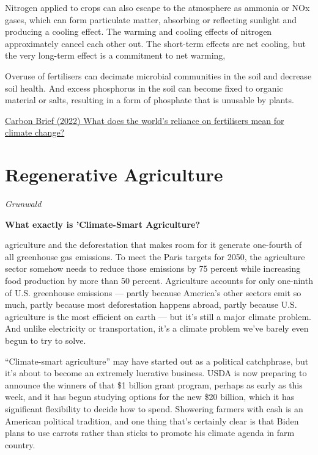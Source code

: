\documentclass[
]{book}
\begin{document}
Nitrogen applied to crops can also escape to the atmosphere as ammonia or NOx gases, which can form particulate matter, absorbing or reflecting sunlight and producing a cooling effect. The warming and cooling effects of nitrogen approximately cancel each other out.
The short-term effects are net cooling, but the very long-term effect is a commitment to net warming,

Overuse of fertilisers can decimate microbial communities in the soil and decrease soil health. And excess phosphorus in the soil can become fixed to organic material or salts, resulting in a form of phosphate that is unusable by plants.

\href{https://www.carbonbrief.org/qa-what-does-the-worlds-reliance-on-fertilisers-mean-for-climate-change/}{Carbon Brief (2022) What does the world's reliance on fertilisers mean for climate change?}

\hypertarget{regenerative-agriculture}{%
\section{Regenerative Agriculture}\label{regenerative-agriculture}}

\emph{Grunwald}

\textbf{What exactly is 'Climate-Smart Agriculture?}

agriculture and the deforestation that makes room for it generate one-fourth of all greenhouse gas emissions. To meet the Paris targets for 2050, the agriculture sector somehow needs to reduce those emissions by 75 percent while increasing food production by more than 50 percent. Agriculture accounts for only one-ninth of U.S. greenhouse emissions --- partly because America's other sectors emit so much, partly because most deforestation happens abroad, partly because U.S. agriculture is the most efficient on earth --- but it's still a major climate problem. And unlike electricity or transportation, it's a climate problem we've barely even begun to try to solve.

``Climate-smart agriculture'' may have started out as a political catchphrase, but it's about to become an extremely lucrative business. USDA is now preparing to announce the winners of that \$1 billion grant program, perhaps as early as this week, and it has begun studying options for the new \$20 billion, which it has significant flexibility to decide how to spend. Showering farmers with cash is an American political tradition, and one thing that's certainly clear is that Biden plans to use carrots rather than sticks to promote his climate agenda in farm country.
\end{document}
